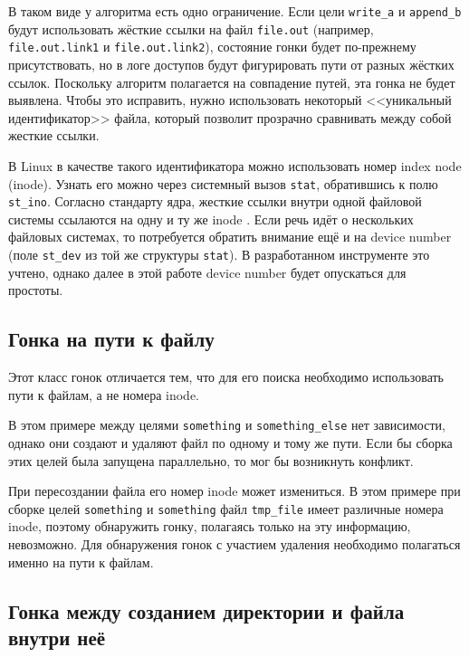 В таком виде у алгоритма есть одно ограничение. Если цели \texttt{write\_a} и \texttt{append\_b} будут использовать жёсткие ссылки на файл \texttt{file.out} (например, \texttt{file.out.link1} и \texttt{file.out.link2}), состояние гонки будет по-прежнему присутствовать, но в логе доступов будут фигурировать пути от разных жёстких ссылок. Поскольку алгоритм полагается на совпадение путей, эта гонка не будет выявлена. Чтобы это исправить, нужно использовать некоторый <<уникальный идентификатор>> файла, который позволит прозрачно сравнивать между собой жесткие ссылки.

В Linux в качестве такого идентификатора можно использовать номер index node (inode). Узнать его можно через системный вызов \texttt{stat}, обратившись к полю \texttt{st\_ino}. Согласно стандарту ядра, жесткие ссылки внутри одной файловой системы ссылаются на одну и ту же inode \cite{inode-docs}. Если речь идёт о нескольких файловых системах, то потребуется обратить внимание ещё и на device number (поле \texttt{st\_dev} из той же структуры \texttt{stat}). В разработанном инструменте это учтено, однако далее в этой работе device number будет опускаться для простоты.

\subsection{Гонка на пути к файлу}

Этот класс гонок отличается тем, что для его поиска необходимо использовать пути к файлам, а не номера inode.



В этом примере между целями \texttt{something} и \texttt{something\_else} нет зависимости, однако они создают и удаляют файл по одному и тому же пути. Если бы сборка этих целей была запущена параллельно, то мог бы возникнуть конфликт.

При пересоздании файла его номер inode может измениться. В этом примере при сборке целей \texttt{something} и \texttt{something} файл \texttt{tmp\_file} имеет различные номера inode, поэтому обнаружить гонку, полагаясь только на эту информацию, невозможно. Для обнаружения гонок с участием удаления необходимо полагаться именно на пути к файлам.

\subsection{Гонка между созданием директории и файла внутри неё}


